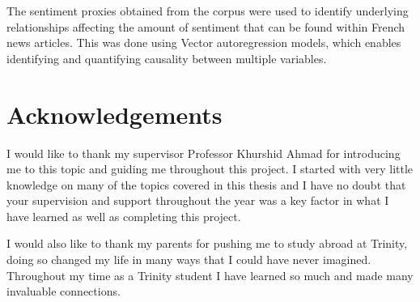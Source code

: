 \documentclass[a4paper,oneside,12pt]{book}
\begin{document}
The sentiment proxies obtained from the corpus were used to identify underlying relationships affecting the amount of sentiment that can be found within French news articles. This was done using Vector autoregression models, which enables identifying and quantifying causality between multiple variables.

\newpage
\onehalfspacing\raggedright %

\section*{\Huge{Acknowledgements}}

I would like to thank my supervisor Professor Khurshid Ahmad for introducing me to this topic and guiding me throughout this project. I started with very little knowledge on many of the topics covered in this thesis and I have no doubt that your supervision and support throughout the year was a key factor in what I have learned as well as completing this project.

I would also like to thank my parents for pushing me to study abroad at Trinity, doing so changed my life in many ways that I could have never imagined. Throughout my time as a Trinity student I have learned so much and made many invaluable connections.

\tableofcontents

\mainmatter
\listoffigures
\listoftables







\end{document}
